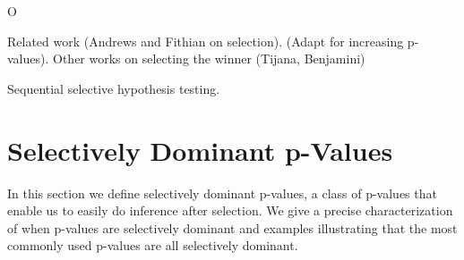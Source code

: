 \documentclass{article}
\begin{document}

O%




Related work (Andrews and Fithian on selection). (Adapt for increasing p-values). Other works on selecting the winner (Tijana, Benjamini) 

Sequential selective hypothesis testing. 






\section{Selectively Dominant p-Values}
\label{sec:dominance}

In this section we define selectively dominant p-values, a class of p-values that enable us to easily do inference after selection. We give a precise characterization of when p-values are selectively dominant and examples illustrating that the most commonly used p-values are all selectively dominant. 
\end{document}
